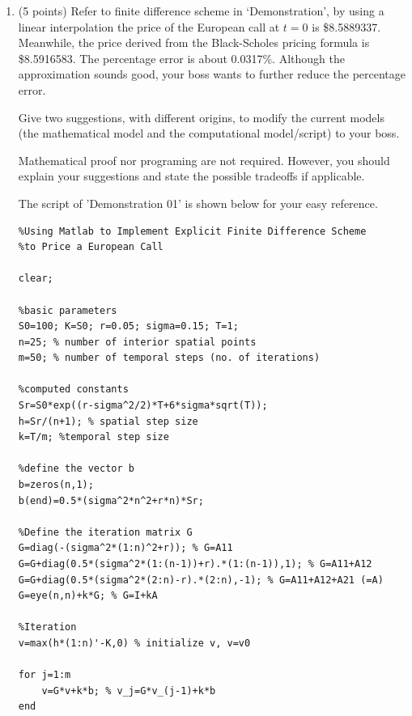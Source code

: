 \documentclass[a4paper,12pt]{article}
\begin{document}
\begin{enumerate}
\begin{proof}
\begin{enumerate}
\begin{enumerate}[label=(\roman*)]
Lastly, as the scheme is consistent with respect to $\|\cdot\|_\infty$. By the Lax theorem, the scheme is convergent with respect to the $\|\cdot\|_\infty$. \qedhere
\end{enumerate} 
\end{enumerate} 
\end{proof}

Remark: 2+8+(4+6)


\newpage

\item (5 points) Refer to finite difference scheme in `Demonstration', by using a linear interpolation the price of the European call at $t=0$ is \$8.5889337. Meanwhile, the price derived from the Black-Scholes pricing formula is \$8.5916583. The percentage error is about 0.0317\%. Although the approximation sounds good, your boss wants to further reduce the percentage error. 

Give two suggestions, with different origins, to modify the current models (the mathematical model and the computational model/script) to your boss.

Mathematical proof nor programing are not required. However, you should explain your suggestions and state the possible tradeoffs if applicable.

The script of 'Demonstration 01' is shown below for your easy reference.

\begin{center}
\begin{Verbatim}[frame=single,fontsize=\footnotesize]
%Demonstration: 
%Using Matlab to Implement Explicit Finite Difference Scheme
%to Price a European Call

clear;

%basic parameters
S0=100; K=S0; r=0.05; sigma=0.15; T=1;
n=25; % number of interior spatial points
m=50; % number of temporal steps (no. of iterations)

%computed constants
Sr=S0*exp((r-sigma^2/2)*T+6*sigma*sqrt(T));
h=Sr/(n+1); % spatial step size
k=T/m; %temporal step size

%define the vector b
b=zeros(n,1);
b(end)=0.5*(sigma^2*n^2+r*n)*Sr;

%Define the iteration matrix G
G=diag(-(sigma^2*(1:n)^2+r)); % G=A11
G=G+diag(0.5*(sigma^2*(1:(n-1))+r).*(1:(n-1)),1); % G=A11+A12
G=G+diag(0.5*(sigma^2*(2:n)-r).*(2:n),-1); % G=A11+A12+A21 (=A)
G=eye(n,n)+k*G; % G=I+kA

%Iteration
v=max(h*(1:n)'-K,0) % initialize v, v=v0

for j=1:m
    v=G*v+k*b; % v_j=G*v_(j-1)+k*b
end
\end{Verbatim}
\end{center}


\end{enumerate}
\end{document}
